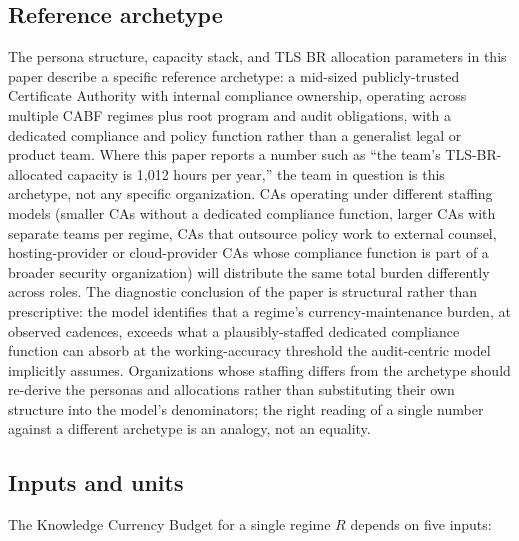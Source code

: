 \documentclass[11pt,letterpaper]{article}
\begin{document}
\subsection{Reference archetype}
\label{sec:archetype}

The persona structure, capacity stack, and TLS BR allocation parameters in this paper describe a specific reference archetype: a mid-sized publicly-trusted Certificate Authority with internal compliance ownership, operating across multiple CABF regimes plus root program and audit obligations, with a dedicated compliance and policy function rather than a generalist legal or product team. Where this paper reports a number such as ``the team's TLS-BR-allocated capacity is 1{,}012 hours per year,'' the team in question is this archetype, not any specific organization. CAs operating under different staffing models (smaller CAs without a dedicated compliance function, larger CAs with separate teams per regime, CAs that outsource policy work to external counsel, hosting-provider or cloud-provider CAs whose compliance function is part of a broader security organization) will distribute the same total burden differently across roles. The diagnostic conclusion of the paper is structural rather than prescriptive: the model identifies that a regime's currency-maintenance burden, at observed cadences, exceeds what a plausibly-staffed dedicated compliance function can absorb at the working-accuracy threshold the audit-centric model implicitly assumes. Organizations whose staffing differs from the archetype should re-derive the personas and allocations rather than substituting their own structure into the model's denominators; the right reading of a single number against a different archetype is an analogy, not an equality.

\subsection{Inputs and units}
\label{sec:inputs}

The Knowledge Currency Budget for a single regime $R$ depends on five inputs:
\end{document}
